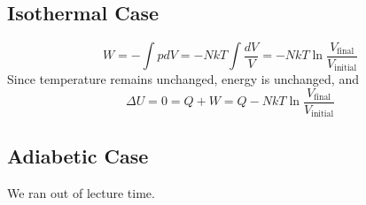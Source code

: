\documentclass[12pt]{article}
\begin{document}
\subsection{Isothermal Case}
$$W = -\int pdV = -NkT\int\frac{dV}{V} = -NkT\ln\frac{V_\text{final}}{V_\text{initial}}$$
Since temperature remains unchanged, energy is unchanged, and
$$\Delta U = 0 = Q + W = Q - NkT\ln\frac{V_\text{final}}{V_\text{initial}}$$

\subsection{Adiabetic Case}
We ran out of lecture time.
\end{document}
